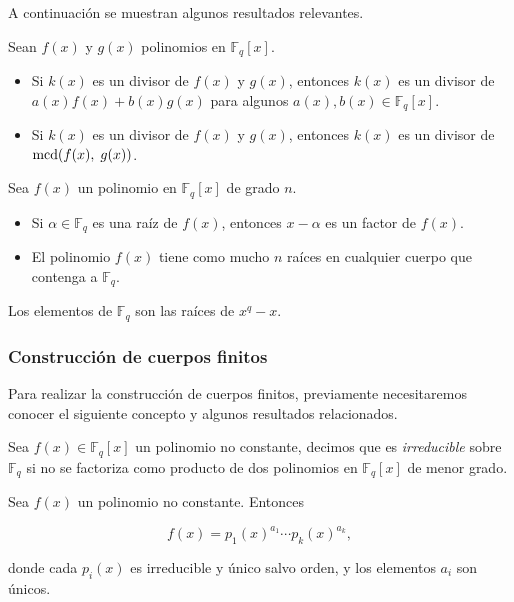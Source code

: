 A continuación se muestran algunos resultados relevantes.

\begin{proposition}
    Sean $f(x)$ y $g(x)$ polinomios en $\mathbb{F}_q[x]$.
    \begin{itemize}
        \item Si $k(x)$ es un divisor de $f(x)$ y $g(x)$, entonces $k(x)$ es un divisor de $a(x) f(x) + b(x) g(x)$ para algunos $a(x), b(x) \in \mathbb{F}_q[x]$.
        \item Si $k(x)$ es un divisor de $f(x)$ y $g(x)$, entonces $k(x)$ es un divisor de $\operatorname{mcd}(f(x), \; g(x))$.
    \end{itemize}
\end{proposition}

\begin{proposition}
    Sea $f(x)$ un polinomio en $\mathbb{F}_q[x]$ de grado $n$.
    \begin{itemize}
        \item Si $\alpha \in \mathbb{F}_q$ es una raíz de $f(x)$, entonces $x - \alpha$ es un factor de $f(x)$.
        \item El polinomio $f(x)$ tiene como mucho $n$ raíces en cualquier cuerpo que contenga a $\mathbb{F}_q$.
    \end{itemize}
\end{proposition}

\begin{theorem}
    Los elementos de $\mathbb{F}_q$ son las raíces de $x^q - x$.
\end{theorem}

\subsubsection{Construcción de cuerpos finitos}

Para realizar la construcción de cuerpos finitos, previamente necesitaremos conocer el siguiente concepto y algunos resultados relacionados.

\begin{definition}
    Sea $f(x) \in \mathbb{F}_q[x]$ un polinomio no constante, decimos que es \emph{irreducible} sobre $\mathbb{F}_q$ si no se factoriza como producto de dos polinomios en $\mathbb{F}_q[x]$ de menor grado.
\end{definition}

\begin{theorem}
    Sea $f(x)$ un polinomio no constante. Entonces

    $$f(x) = p_1(x)^{a_1} \cdots p_k(x)^{a_k},$$

    donde cada $p_i(x)$ es irreducible y único salvo orden, y los elementos $a_i$ son únicos.
\end{theorem}

